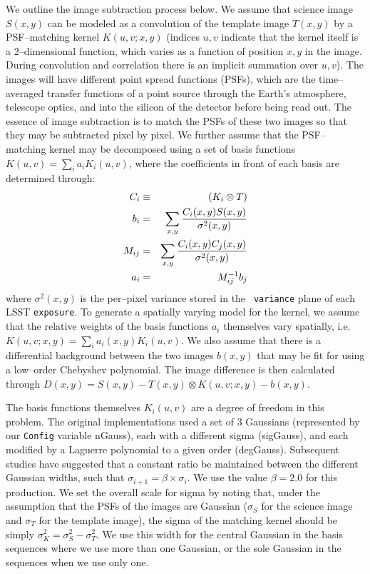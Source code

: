 \documentclass[prd, nofootinbib, floatfix, 11pt,tightenlines,times]{article}
\begin{document}
We outline the image subtraction process below.  We assume that science
image $S(x,y)$ can be modeled as a convolution of the template image
$T(x,y)$ by a PSF--matching kernel $K(u,v;x,y)$ (indices $u,v$ indicate
that the kernel itself is a 2--dimensional function, which varies as a
function of position $x,y$ in the image.  During convolution and correlation
there is an implicit summation over $u,v$).  The images will have
different point spread functions (PSFs), which are the time--averaged
transfer functions of a point source through the Earth's atmosphere,
telescope optics, and into the silicon of the detector before being
read out.  The essence of image subtraction is to match the PSFs of
these two images so that they may be subtracted pixel by pixel.  We
further assume that the PSF--matching kernel may be decomposed using a
set of basis functions $K(u,v) = \sum_i a_i K_i(u,v)$, where the
coefficients in front of each basis are determined through:
%
\begin{eqnarray}
C_i & \equiv & (K_i \otimes T) \\ \nonumber
b_{i}  & = & \sum_{x,y} {{C_i(x,y) S(x,y)}\over{\sigma^2(x,y)}}   \nonumber \\ 
M_{ij} & = & \sum_{x,y} {{C_i(x,y) C_j(x,y)}\over{\sigma^2(x,y)}}  \nonumber \\ 
a_{i}  & = & M^{-1}_{ij} b_{j} \nonumber 
\label{eq-soln}
\end{eqnarray}
where $\sigma^2(x,y)$ is the per--pixel variance stored in the {\tt
  variance} plane of each LSST {\tt exposure}.  To generate a
spatially varying model for the kernel, we assume that the relative
weights of the basis functions $a_i$ themselves vary spatially,
i.e. $K(u,v;x,y) = \sum_i a_i(x,y) K_i(u,v)$.  We also assume that
there is a differential background between the two images $b(x,y)$
that may be fit for using a low--order Chebyshev polynomial.  The
image difference is then calculated through $D(x,y) = S(x,y) - T(x,y)
\otimes K(u,v;x,y) - b(x,y)$.

The basis functions themselves $K_i(u,v)$ are a degree of freedom in
this problem.  The original implementations \citep{Alard98,Alard00}
used a set of 3 Gaussians (represented by our {\tt Config} variable
nGauss), each with a different sigma (sigGauss), and each modified by
a Laguerre polynomial to a given order (degGauss).  Subsequent studies
\citep[e.g.][]{2007AN....328...16I} have suggested that a constant
ratio be maintained between the different Gaussian widths, such that
$\sigma_{i+1} = \beta \times \sigma_{i}$.  We use the value $\beta =
2.0$ for this production.  We set the overall scale for sigma by
noting that, under the assumption that the PSFs of the images are
Gaussian ($\sigma_S$ for the science image and $\sigma_T$ for the
template image), the sigma of the matching kernel should be simply
$\sigma_K^2 = \sigma_S^2 - \sigma_T^2$.  We use this width for the
central Gaussian in the basis sequences where we use more than one
Gaussian, or the sole Gaussian in the sequences when we use only one.
\end{document}
